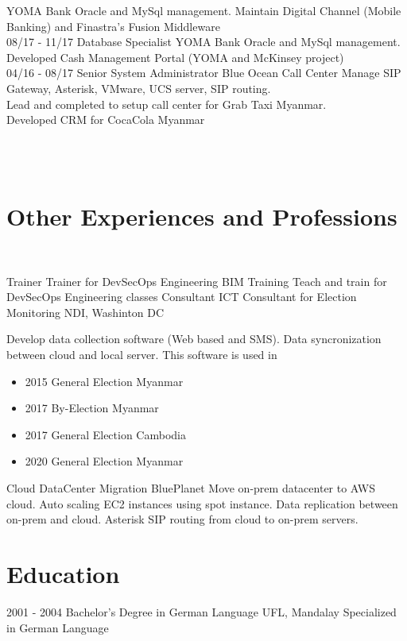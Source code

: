 \documentclass[]{friggeri-cv}
\begin{document}
\begin{entrylist}
    {YOMA Bank}
    {Oracle and MySql management. Maintain Digital Channel (Mobile Banking) and Finastra's Fusion Middleware\\
    }
  \entry
    {08/17 - 11/17}
    {Database Specialist}
    {YOMA Bank}
    {Oracle and MySql management. Developed Cash Management Portal (YOMA and McKinsey project)\\}
  \entry
    {04/16 - 08/17}
    {Senior System Administrator}
    {Blue Ocean Call Center}
    {Manage SIP Gateway, Asterisk, VMware, UCS server, SIP routing.\\ Lead and completed to setup call center for Grab Taxi Myanmar.\\ Developed CRM for CocaCola Myanmar\\ }
    ~
\end{entrylist}
\newpage
~
\section{Other Experiences and Professions}
~
\begin{entrylist}
	\entry
	{Trainer}
	{Trainer for DevSecOps Engineering}
	{BIM Training}
	{Teach and train for DevSecOps Engineering classes}
	\entry
	{Consultant}
	{ICT Consultant for Election Monitoring}
	{NDI, Washinton DC}
	{Develop data collection software (Web based and SMS). Data syncronization between cloud and local server. This software is used in 
		\begin{itemize}
			\item 2015 General Election Myanmar
			\item 2017 By-Election Myanmar
			\item 2017 General Election Cambodia
			\item 2020 General Election Myanmar
		\end{itemize}}
	\entry
	{Cloud}
	{DataCenter Migration}
	{BluePlanet}
	{Move on-prem datacenter to AWS cloud. Auto scaling EC2 instances using spot instance. Data replication between on-prem and cloud. Asterisk SIP routing from cloud to on-prem servers.\\}
\end{entrylist}
\section{Education}
\begin{entrylist}
  \entry
    {2001 - 2004}
    {Bachelor's Degree in German Language}
    {UFL, Mandalay}
    {Specialized in German Language\\ }
\end{entrylist}
\end{document}
